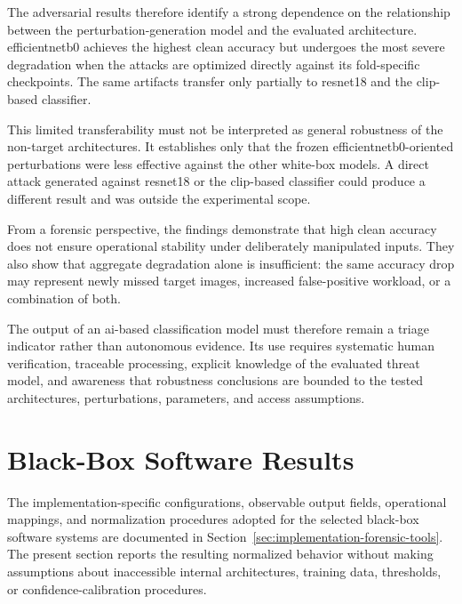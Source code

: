 The adversarial results therefore identify a strong dependence on the
relationship between the perturbation-generation model and the evaluated
architecture. \gls{efficientnetb0} achieves the highest clean accuracy but undergoes
the most severe degradation when the attacks are optimized directly against
its fold-specific checkpoints. The same artifacts transfer only partially to
\gls{resnet18} and the \gls{clip}-based classifier.

This limited transferability must not be interpreted as general robustness of
the non-target architectures. It establishes only that the frozen
\gls{efficientnetb0}-oriented perturbations were less effective against the other
white-box models. A direct attack generated against \gls{resnet18} or the
\gls{clip}-based classifier could produce a different result and was outside the
experimental scope.

From a forensic perspective, the findings demonstrate that high clean accuracy
does not ensure operational stability under deliberately manipulated inputs.
They also show that aggregate degradation alone is insufficient: the same
accuracy drop may represent newly missed target images, increased false-positive
workload, or a combination of both.

The output of an \gls{ai}-based classification model must therefore remain a
triage indicator rather than autonomous evidence. Its use requires systematic
human verification, traceable processing, explicit knowledge of the evaluated
threat model, and awareness that robustness conclusions are bounded to the
tested architectures, perturbations, parameters, and access assumptions.

\section{Black-Box Software Results}
\label{sec:results-commercial}

The implementation-specific configurations, observable output fields,
operational mappings, and normalization procedures adopted for the selected
black-box software systems are documented in
Section~\ref{sec:implementation-forensic-tools}. The present section reports
the resulting normalized behavior without making assumptions about inaccessible
internal architectures, training data, thresholds, or confidence-calibration
procedures.

